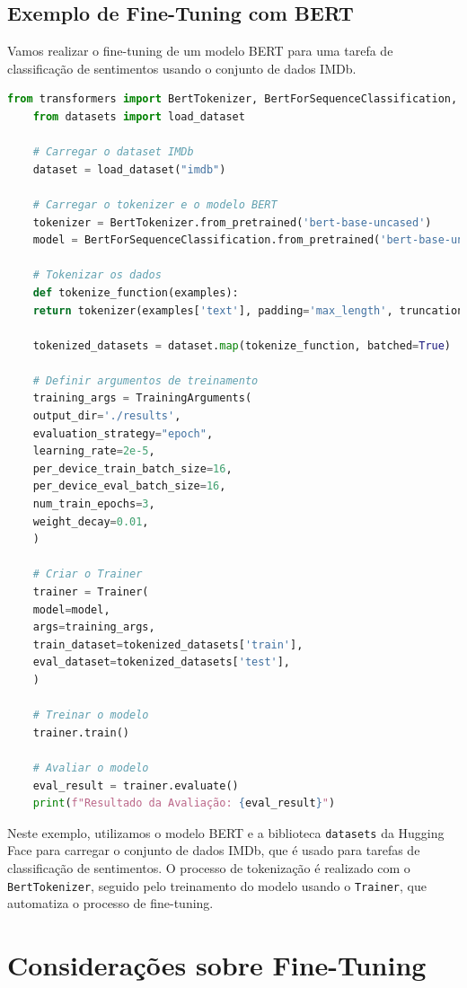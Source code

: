 \documentclass[14pt,a4paper,oneside]{book}
\begin{document}
\subsection{Exemplo de Fine-Tuning com BERT}

Vamos realizar o fine-tuning de um modelo BERT para uma tarefa de classificação de sentimentos usando o conjunto de dados IMDb.

\begin{lstlisting}[language=Python]
	from transformers import BertTokenizer, BertForSequenceClassification, Trainer, TrainingArguments
	from datasets import load_dataset
	
	# Carregar o dataset IMDb
	dataset = load_dataset("imdb")
	
	# Carregar o tokenizer e o modelo BERT
	tokenizer = BertTokenizer.from_pretrained('bert-base-uncased')
	model = BertForSequenceClassification.from_pretrained('bert-base-uncased')
	
	# Tokenizar os dados
	def tokenize_function(examples):
	return tokenizer(examples['text'], padding='max_length', truncation=True)
	
	tokenized_datasets = dataset.map(tokenize_function, batched=True)
	
	# Definir argumentos de treinamento
	training_args = TrainingArguments(
	output_dir='./results',
	evaluation_strategy="epoch",
	learning_rate=2e-5,
	per_device_train_batch_size=16,
	per_device_eval_batch_size=16,
	num_train_epochs=3,
	weight_decay=0.01,
	)
	
	# Criar o Trainer
	trainer = Trainer(
	model=model,
	args=training_args,
	train_dataset=tokenized_datasets['train'],
	eval_dataset=tokenized_datasets['test'],
	)
	
	# Treinar o modelo
	trainer.train()
	
	# Avaliar o modelo
	eval_result = trainer.evaluate()
	print(f"Resultado da Avaliação: {eval_result}")
\end{lstlisting}

Neste exemplo, utilizamos o modelo BERT e a biblioteca \texttt{datasets} da Hugging Face para carregar o conjunto de dados IMDb, que é usado para tarefas de classificação de sentimentos. O processo de tokenização é realizado com o \texttt{BertTokenizer}, seguido pelo treinamento do modelo usando o \texttt{Trainer}, que automatiza o processo de fine-tuning.

\section{Considerações sobre Fine-Tuning}
\end{document}
